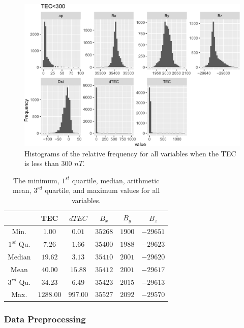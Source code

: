 \documentclass[sn-mathphys-num]{sn-jnl}%
\begin{document}
\begin{figure}
 \centering
 \includegraphics[width=0.9\linewidth]{300TEC_fix.pdf}
    \caption{Histograms of the relative frequency for all variables when the TEC is less than $300$ $nT$.}
    \label{fig:300TEC}
\end{figure}

\begin{table}[!ht]
    \centering
    \caption{The minimum, $1^{st}$ quartile, median, arithmetic mean, $3^{rd}$ quartile, and maximum values for all variables.}
    \label{tab:my_label}
    \begin{tabular}{|c|c|c|c|c|c|}
        \hline
        & TEC & $dTEC$ & $B_{x}$ & $B_{y}$ & $B_{z}$ \\ \hline
        Min. & $1.00$ & $0.01$ & $35268$ & $1900$ & $-29651$ \\ \hline
        $1^{st}$ Qu. & $7.26$ & $1.66$ & $35400$ & $1988$ & $-29623$ \\ \hline
        Median & $19.62$ & $3.13$ & $35410$ & $2001$ & $-29620$ \\ \hline
        Mean & $40.00$ & $15.88$ & $35412$ & $2001$ & $-29617$ \\ \hline
        $3^{rd}$ Qu. & $34.23$ & $6.49$ & $35423$ & $2015$ & $-29613$ \\ \hline
        Max. & $1288.00$ & $997.00$ & $35527$ & $2092$ & $-29570$ \\ \hline
    \end{tabular}
\end{table}

\subsubsection{Data Preprocessing}
\end{document}
